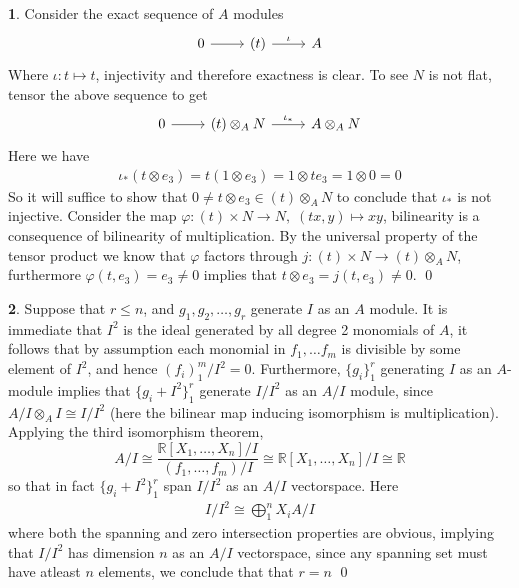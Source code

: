 \documentclass[11pt]{article}
\theoremstyle{definition}
\newtheorem{pb}{}
\newcommand{\set}[1]{\{#1\}}
\begin{document}
\begin{pb}
        Consider the exact sequence of \(A\) modules
        \begin{equation*}
            \begin{tikzcd}
                0 \arrow[r,"{}"] &(t) \arrow[r,"{\iota}"] & A
            \end{tikzcd}
        \end{equation*}
        Where \(\iota: t\mapsto t\), injectivity and therefore exactness is clear. To see \(N\) is not flat, tensor the above sequence to get
        \begin{equation*}
            \begin{tikzcd}
                0 \arrow[r,"{}"] &(t)\otimes_A N \arrow[r,"{\iota_*}"] &A \otimes_A N
            \end{tikzcd}
        \end{equation*}
        Here we have
        \begin{align*}
            \iota_*(t\otimes e_3) = t(1\otimes e_3) = 1\otimes t e_3 = 1 \otimes 0 = 0
        \end{align*}
        So it will suffice to show that \(0 \neq t \otimes e_3 \in (t)\otimes_A N\) to conclude that \(\iota_*\) is not injective. Consider the map \(\varphi: (t) \times N \to N, \; (tx,y) \mapsto xy\), bilinearity is a consequence of bilinearity of multiplication. By the universal property of the tensor product we know that \(\varphi\) factors through \(j: (t) \times N \to (t) \otimes_A N\), furthermore \(\varphi(t,e_3) = e_3 \neq 0\) implies that \(t \otimes e_3 = j(t,e_3) \neq 0\). \qed
    \end{pb}

    \color{black}
    \begin{pb}
        Suppose that \(r \leq n\), and \(g_1,g_2,\hdots,g_r\) generate \(I\) as an \(A\) module. It is immediate that \(I^2\) is the ideal generated by all degree 2 monomials of \(A\), it follows that by assumption each monomial in \(f_1,\hdots f_m\) is divisible by some element of \(I^2\), and hence \((f_i)_1^m/I^2 = 0\). Furthermore, \(\set{g_i}_1^r\) generating \(I\) as an \(A\)-module implies that \(\set{g_i + I^2}_1^r\) generate \(I/I^2\) as an \(A/I\) module, since \(A/I \otimes_A I \cong I/I^2\) (here the bilinear map inducing isomorphism is multiplication). Applying the third isomorphism theorem, \[A/I \cong \frac{\mathbb{R}[X_1,\hdots,X_n]/I}{(f_1,\hdots,f_m)/I} \cong \mathbb{R}[X_1,\hdots,X_n]/I \cong \mathbb{R}\]
        so that in fact \(\set{g_i + I^2}_1^r\) span \(I/I^2\) as an \(A/I\) vectorspace. Here
        \begin{align*}
            I/I^2 \cong \bigoplus_1^n X_iA/I
        \end{align*}
        where both the spanning and zero intersection properties are obvious, implying that \(I/I^2\) has dimension \(n\) as an \(A/I\) vectorspace, since any spanning set must have atleast \(n\) elements, we conclude that that \(r = n\) \qed
    \end{pb}
\end{document}
